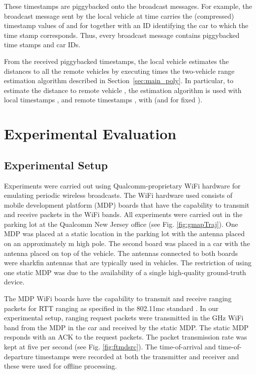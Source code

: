 \documentclass[12pt,journal,final,onecolumn]{IEEEtran}
\theoremstyle{definition}
\theoremstyle{myremark}
\begin{document}
These timestamps are piggybacked onto the broadcast messages. For example, the
broadcast message sent by the local vehicle at time  carries the
(compressed) timestamp values of  and  for
 together with an ID identifying the car to which the time
stamp corresponds. Thus, every broadcast message contains  piggybacked time
stamps and car IDs.

From the received piggybacked timestamps, the local vehicle estimates the
distances to all the  remote vehicles by executing  times the two-vehicle
range estimation algorithm described in Section~\ref{sec:main_poly}. In
particular, to estimate the distance to remote vehicle , the estimation
algorithm is used with local timestamps ,  and remote
timestamps ,  with  (and for fixed
).


\section{Experimental Evaluation}
\label{sec:experiments}


\subsection{Experimental Setup}
\label{sec:experiments_setup}

Experiments were carried out using Qualcomm-proprietary WiFi hardware for
emulating periodic wireless broadcasts. The WiFi hardware used consists of
mobile development platform (MDP) boards that have the capability to transmit
and receive packets in the WiFi bands. All experiments were carried out in the
parking lot at the Qualcomm New Jersey office (see Fig. \ref{fig:gmapTraj}). One
MDP was placed at a static location in the parking lot with the antenna placed
on an approximately  m high pole. The second board was placed in a car with
the antenna placed on top of the vehicle. The antennas connected to both boards
were sharkfin antennas that are typically used in vehicles. The restriction of
using one static MDP was due to the availability of a single high-quality
ground-truth device.

The MDP WiFi boards have the capability to transmit and receive ranging packets
for RTT ranging as specified in the 802.11mc standard \cite{11mc}. In our
experimental setup, ranging request packets were transmitted in the  GHz
WiFi band from the MDP in the car and received by the static MDP. The static MDP
responds with an ACK to the request packets. The packet transmission rate was
kept at five per second (see Fig. \ref{fig:ftmdsrc}). The time-of-arrival and
time-of-departure timestamps were recorded at both the transmitter and receiver
and these were used for offline processing. 
\end{document}
